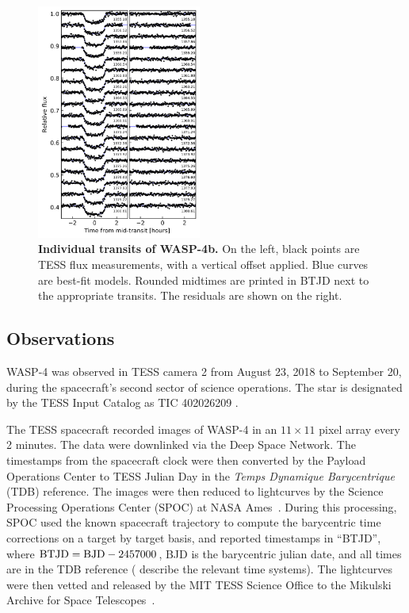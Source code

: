 \documentclass[12pt,twocolumn,tighten]{aastex62}
\begin{document}
\begin{figure}[t]
    \begin{center}
        \includegraphics[width=0.48\textwidth]{f2.png}
    \end{center}
    \vspace{-0.5cm}
    \caption{
        {\bf Individual transits of WASP-4b.} On the left, black
        points are TESS flux measurements, with a vertical offset
        applied. Blue curves are best-fit models. Rounded midtimes are
        printed in BTJD next to the appropriate transits.  The
        residuals are shown on the right.
        \label{fig:lightcurves}
    }
\end{figure}

\subsection{Observations}
\label{sec:observations}

WASP-4 was observed in TESS camera 2 from August 23, 2018 to September
20, during the spacecraft's second sector of science operations.  The
star is designated by the TESS Input Catalog as TIC 402026209
\citep{stassun_TIC_2018}.

The TESS spacecraft recorded images of WASP-4 in an $11\times11$ pixel
array every 2 minutes.   The data were downlinked via the Deep Space
Network. The timestamps from the spacecraft clock were then converted
by the Payload Operations Center to TESS Julian Day in the {\it
Temps Dynamique Barycentrique} (TDB) reference.  The images were then
reduced to lightcurves by the Science Processing Operations Center (SPOC)
at NASA Ames~\citep{jenkins_tess_2016}.  During this processing, SPOC used
the known
spacecraft trajectory to compute the barycentric time corrections on a
target by target basis, and reported timestamps in ``BTJD'', where
${\rm BTJD} = {\rm BJD} - 2457000$, BJD is the barycentric julian
date, and all times are in the TDB reference (\citealt{urban_explanatory_2012} 
describe the relevant time systems).
The lightcurves were then vetted and released by the MIT TESS Science
Office to the Mikulski Archive for Space
Telescopes~\citep{ricker_tess_alerts_2018}.
\end{document}
